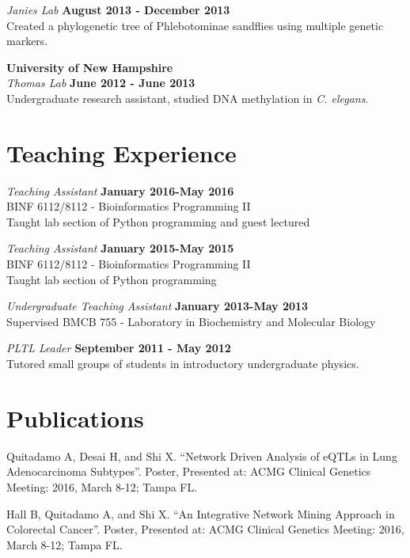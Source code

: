 \documentclass[margin,line]{res}
\begin{document}
\begin{resume}
{\em Janies Lab} \hfill {\bf August 2013 - December 2013}\\
Created a phylogenetic tree of Phlebotominae sandflies using multiple genetic markers.    
\hspace*{.05in} 

{\bf University of New Hampshire}\\
{\em Thomas Lab} \hfill {\bf June 2012 - June 2013}\\
Undergraduate research assistant, studied DNA methylation in {\em C. elegans}.\\ 


\section{\sc Teaching Experience}

{\em Teaching Assistant} \hfill {\bf January 2016-May 2016}\\
BINF 6112/8112 - Bioinformatics Programming II\\
Taught lab section of Python programming and guest lectured

{\em Teaching Assistant} \hfill {\bf January 2015-May 2015}\\
BINF 6112/8112 - Bioinformatics Programming II\\
Taught lab section of Python programming

{\em Undergraduate Teaching Assistant} \hfill {\bf January 2013-May 2013}\\
Supervised BMCB 755 - Laboratory in Biochemistry and Molecular Biology

{\em PLTL Leader} \hfill {\bf September 2011 - May 2012}\\
Tutored small groups of students in introductory undergraduate physics.

\section{\sc Publications}

Quitadamo A, Desai H, and Shi X. ``Network Driven Analysis of eQTLs in Lung Adenocarcinoma Subtypes''. Poster, Presented at: ACMG Clinical Genetics Meeting: 2016, March 8-12; Tampa FL.

Hall B, Quitadamo A, and Shi X. ``An Integrative Network Mining Approach in Colorectal Cancer''. Poster, Presented at: ACMG Clinical Genetics Meeting: 2016, March 8-12; Tampa FL.


\end{resume}
\end{document}
